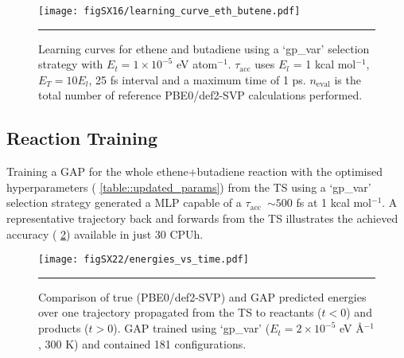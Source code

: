 \documentclass[11pt]{article}
\numberwithin{equation}{subsection}
\newcommand{\kcal}{kcal mol$^{-1}$}
\newcommand{\tacc}{$\tau_\text{acc}$}
\begin{document}
\begin{figure}[h!]
	\centering
	\vspace{0.4cm}
	\texttt{[image: figSX16/learning\_curve\_eth\_butene.pdf]}
	\vspace{0.1cm}
	\hrule
	\vspace{0.1cm}
	\caption{Learning curves for ethene and butadiene using a `gp\_var' selection strategy with $E_t = 1\times10^{-5}$ eV atom${}^{-1}$. $\tau_\text{acc}$ uses $E_l$ = 1 \kcal, $E_T = 10E_l$, 25 fs interval and a maximum time of 1 ps. $n_\text{eval}$ is the total number of reference PBE0/def2-SVP calculations performed.}
	\label{fig::SX16}
\end{figure}


\subsection{Reaction Training}

Training a GAP for the whole ethene+butadiene reaction with the optimised hyperparameters (\tablename{ \ref{table::updated_params}}) from the TS using a `gp\_var' selection strategy generated a MLP capable of a \tacc~$\sim 500$ fs at 1 \kcal. A representative trajectory back and forwards from the TS illustrates the achieved accuracy (\figurename{ \ref{fig::SX22}}) available in just 30 CPUh.


\begin{figure}[h!]
	\centering
	\vspace{0.4cm}
	\texttt{[image: figSX22/energies\_vs\_time.pdf]}
	\vspace{0.1cm}
	\hrule
	\vspace{0.1cm}
	\caption{Comparison of true (PBE0/def2-SVP) and GAP predicted energies over one trajectory propagated from the TS to reactants ($t < 0$) and products ($t > 0$). GAP trained using `gp\_var' ($E_t = 2\times10^{-5}$ eV \AA${}^{-1}$, 300 K) and contained 181 configurations.}
	\label{fig::SX22}
\end{figure}
\end{document}
